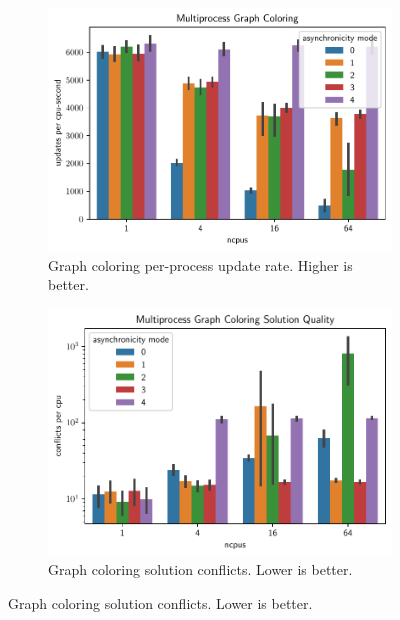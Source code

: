 \begin{figure}[thpb]
      \centering

    \begin{subfigure}[b]{0.49\textwidth}
    \centering
    \includegraphics[width=\linewidth]{chart/multiprocess-graph-coloring}
    \caption{Graph coloring per-process update rate. Higher is better.}
    \label{fig:multiprocess_graph_coloring_update_rate}
    \end{subfigure}

    \begin{subfigure}[b]{0.49\textwidth}
      \centering
      \includegraphics[width=\linewidth]{chart/multiprocess-graph-coloring-solution-quality}
      \caption{Graph coloring solution conflicts. Lower is better.}
      \label{fig:multiprocess_graph_coloring_solution_quality}
    \end{subfigure}


\end{figure}
